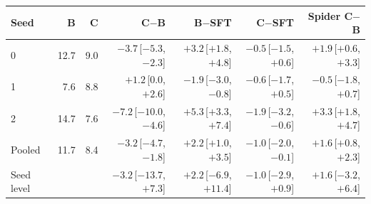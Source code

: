\begin{tabular}{lrrrrrr}
\toprule
Seed & B & C & C$-$B & B$-$SFT & C$-$SFT & Spider C$-$B \\
\midrule
0 & 12.7 & 9.0 & $-3.7${\,[$-5.3$, $-2.3$]} & $+3.2${\,[$+1.8$, $+4.8$]} & $-0.5${\,[$-1.5$, $+0.6$]} & $+1.9${\,[$+0.6$, $+3.3$]} \\
1 & 7.6 & 8.8 & $+1.2${\,[$0.0$, $+2.6$]} & $-1.9${\,[$-3.0$, $-0.8$]} & $-0.6${\,[$-1.7$, $+0.5$]} & $-0.5${\,[$-1.8$, $+0.7$]} \\
2 & 14.7 & 7.6 & $-7.2${\,[$-10.0$, $-4.6$]} & $+5.3${\,[$+3.3$, $+7.4$]} & $-1.9${\,[$-3.2$, $-0.6$]} & $+3.3${\,[$+1.8$, $+4.7$]} \\
Pooled & 11.7 & 8.4 & $-3.2${\,[$-4.7$, $-1.8$]} & $+2.2${\,[$+1.0$, $+3.5$]} & $-1.0${\,[$-2.0$, $-0.1$]} & $+1.6${\,[$+0.8$, $+2.3$]} \\
Seed level & & & $-3.2${\,[$-13.7$, $+7.3$]} & $+2.2${\,[$-6.9$, $+11.4$]} & $-1.0${\,[$-2.9$, $+0.9$]} & $+1.6${\,[$-3.2$, $+6.4$]} \\
\bottomrule
\end{tabular}
